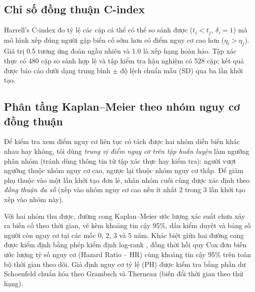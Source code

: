 \subsection{Chỉ số đồng thuận C-index}
Harrell's C-index \cite{harrell1996multivariable} đo tỷ lệ các cặp cá thể có thể so sánh được ($t_i<t_j$, $\delta_i=1$) mà mô hình xếp đúng người gặp biến cố sớm hơn có điểm nguy cơ cao hơn ($\eta_i>\eta_j$). Giá trị 0.5 tương ứng đoán ngẫu nhiên và 1.0 là xếp hạng hoàn hảo. Tập xác thực có 480 cặp so sánh hợp lệ và tập kiểm tra hậu nghiệm có 528 cặp; kết quả được báo cáo dưới dạng trung bình $\pm$ độ lệch chuẩn mẫu (SD) qua ba lần khởi tạo.

\subsection{Phân tầng Kaplan--Meier theo nhóm nguy cơ đồng thuận}
Để kiểm tra xem điểm nguy cơ liên tục có tách được hai nhóm diễn biến khác nhau hay không, tôi dùng \emph{trung vị điểm nguy cơ trên tập huấn luyện} làm ngưỡng phân nhóm (tránh dùng thông tin từ tập xác thực hay kiểm tra): người vượt ngưỡng thuộc nhóm nguy cơ cao, ngược lại thuộc nhóm nguy cơ thấp. Để giảm phụ thuộc vào một lần khởi tạo đơn lẻ, nhãn nhóm cuối cùng được xác định theo \emph{đồng thuận đa số} (xếp vào nhóm nguy cơ cao nếu ít nhất 2 trong 3 lần khởi tạo xếp vào nhóm này).

Với hai nhóm thu được, đường cong Kaplan--Meier \cite{kaplan1958nonparametric} ước lượng xác suất chưa xảy ra biến cố theo thời gian, vẽ kèm khoảng tin cậy 95\%, dấu kiểm duyệt và bảng số người còn nguy cơ tại các mốc 0, 2, 3 và 5 năm. Khác biệt giữa hai đường cong được kiểm định bằng phép kiểm định log-rank \cite{mantel1966survival}, đồng thời hồi quy Cox đơn biến ước lượng tỷ số nguy cơ (Hazard Ratio -- HR) cùng khoảng tin cậy 95\% trên toàn bộ thời gian theo dõi. Giả định nguy cơ tỷ lệ (PH) được kiểm tra bằng phần dư Schoenfeld chuẩn hóa theo Grambsch và Therneau \cite{grambsch1994proportional} (biến đổi thời gian theo thứ hạng).

